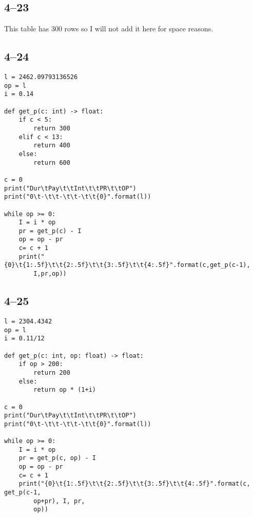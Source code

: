 \documentclass[a4paper, 12pt, reqno]{amsart}
\numberwithin{equation}{section}
\begin{document}
\subsection*{4--23}

This table has 300 rows so I will not add it here for space reasons.

\subsection*{4--24}

\begin{verbatim}
l = 2462.09793136526
op = l
i = 0.14

def get_p(c: int) -> float:
    if c < 5:
        return 300
    elif c < 13:
        return 400
    else:
        return 600

c = 0
print("Dur\tPay\t\tInt\t\tPR\t\tOP")
print("0\t-\t\t-\t\t-\t\t{0}".format(l))

while op >= 0:
    I = i * op
    pr = get_p(c) - I
    op = op - pr
    c= c + 1
    print("{0}\t{1:.5f}\t\t{2:.5f}\t\t{3:.5f}\t\t{4:.5f}".format(c,get_p(c-1),
        I,pr,op))
\end{verbatim}

\subsection*{4--25}

\begin{verbatim}
l = 2304.4342
op = l
i = 0.11/12

def get_p(c: int, op: float) -> float:
    if op > 200:
        return 200
    else:
        return op * (1+i)

c = 0
print("Dur\tPay\t\tInt\t\tPR\t\tOP")
print("0\t-\t\t-\t\t-\t\t{0}".format(l))

while op >= 0:
    I = i * op
    pr = get_p(c, op) - I
    op = op - pr
    c= c + 1
    print("{0}\t{1:.5f}\t\t{2:.5f}\t\t{3:.5f}\t\t{4:.5f}".format(c, get_p(c-1,
        op+pr), I, pr,
        op))
\end{verbatim}
\end{document}
